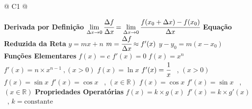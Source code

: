 		\begin{longtable}{
		@{}
		C{1\textwidth} 
		@{}}
		
			\toprule
			\textbf{Derivada por Definição}
			\tabularnewline
			\midrule
			{\large $\lim \limits_{\Delta x \to 0} \cfrac{\Delta f}{\Delta x} = \lim \limits_{\Delta x \to 0} \cfrac{f(x_{0} + \Delta x) - f(x_{0})}{\Delta x}$}
			\tabularnewline
			\midrule
			\textbf{Equação Reduzida da  Reta}
			\tabularnewline
			\midrule
			{\large $y = mx + n$ \hspace{1cm} $m = \cfrac{\Delta f}{\Delta x} \approx f'(x)$ \hspace{1 cm} $y - y_{0} = m(x - x_{0})$}
			\tabularnewline
			\midrule
			\textbf{Funções Elementares}
			\tabularnewline
			\midrule
			{\large $f(x) = c$ \hspace{1cm} $f'(x) = 0$}
			\tabularnewline
			\midrule
			{\large $f(x) = x^{n}$ \hspace{1cm} $f'(x) = n \times x^{n-1} \ , (x >0)$}
			\tabularnewline
			\midrule
			{\large $f(x) = \ln x$\hspace{1cm} $f'(x) = \cfrac{1}{x}$ \ , $(x > 0)$}
			\tabularnewline
			\midrule
			{\large $f(x) = \sin x$ \hspace{1cm} $f'(x) = \cos x$ \ , $(x \in \mathbb{R})$}
			\tabularnewline
			\midrule
			{\large $f(x) = \cos x$ \hspace{1cm} $f'(x) = \sin x$ \ , $(x \in \mathbb{R})$}
			\tabularnewline
			\midrule
			\textbf{Propriedades Operatórias}
			\tabularnewline
			\midrule
			{\large $f(x) = k \times g(x)$ \hspace{1cm} $f'(x) = k \times g'(x)$ \ , $k = \text{constante}$}
			\tabularnewline
			\midrule

\end{longtable}
